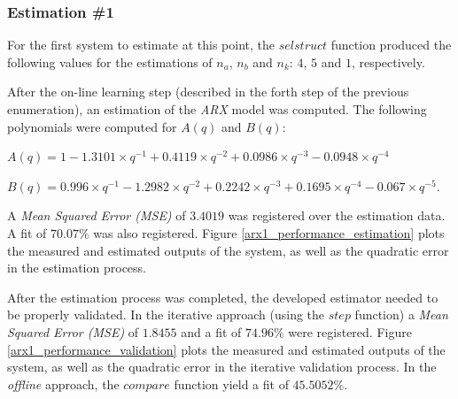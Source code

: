 \documentclass[11pt]{article}
\begin{document}
\subsubsection{Estimation \#1}
\label{estimation1}

For the first system to estimate at this point, the $selstruct$ function produced the following values for the estimations of $n_{a}$, $n_{b}$ and $n_{k}$: $4$, $5$ and $1$, respectively.

After the on-line learning step (described in the forth step of the previous enumeration), an estimation of the \emph{ARX} model was computed. The following polynomials were computed for $A(q)$ and $B(q)$:

$A(q) = 1 - 1.3101 \times q^{-1} + 0.4119 \times q^{-2} + 0.0986 \times q^{-3} - 0.0948 \times q^{-4}$

$B(q) = 0.996 \times q^{-1} -1.2982 \times q^{-2} + 0.2242 \times q^{-3} + 0.1695 \times q^{-4} - 0.067 \times q^{-5} $.

A \emph{Mean Squared Error (MSE)} of $3.4019$ was registered over the estimation data. A fit of $70.07\%$ was also registered. Figure \ref{arx1_performance_estimation} plots the measured and estimated outputs of the system, as well as the quadratic error in the estimation process.

After the estimation process was completed, the developed estimator needed to be properly validated. In the iterative approach (using the $step$ function) a \emph{Mean Squared Error (MSE)} of $1.8455$ and a fit of $74.96\%$ were registered. Figure \ref{arx1_performance_validation} plots the measured and estimated outputs of the system, as well as the quadratic error in the iterative validation process. In the \emph{offline} approach, the $compare$ function yield a fit of $45.5052\%$.
\end{document}
